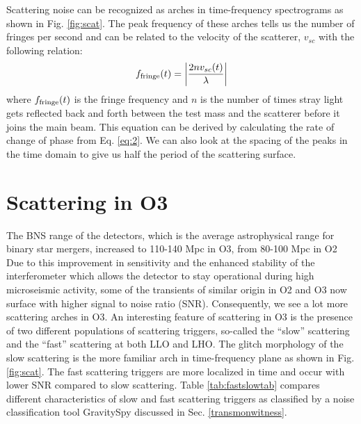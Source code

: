 \documentclass[12pt]{iopart}
\begin{document}
Scattering noise can be recognized as arches in time-frequency spectrograms as shown in Fig. \ref{fig:scat}. The peak frequency of these arches tells us the number of fringes per second and can be related to the velocity of the scatterer, $v_{sc}$ with the following relation:
\begin{equation}
    f_{\rm fringe}(t) = \left|\frac{2nv_{sc}(t)}{\lambda}\right|  \label{eq:3}
\end{equation}
where $f_{\rm fringe}(t)$ is the fringe frequency and $n$ is the number of times stray light gets reflected back and forth between the test mass and the scatterer before it joins the main beam. This equation can be derived by calculating the rate of change of phase from Eq. \ref{eq:2}.  We can also look at the spacing of the peaks in the time domain to give us half the period of the scattering surface. 






\section{Scattering in O3}\label{scatino3}
The BNS range of the detectors, which is the average astrophysical range for binary star mergers, increased to 110-140 Mpc in O3, from 80-100 Mpc in O2~\cite{prospect} Due to this improvement in sensitivity and the enhanced stability of the interferometer which allows the detector to stay operational during high microseismic activity, some of the transients of similar origin in O2 and O3 now surface with higher signal to noise ratio (SNR). 
Consequently, we see a lot more scattering arches in O3. An interesting feature of scattering in O3 is the presence of two different populations of scattering triggers, so-called the ``slow'' scattering and the ``fast'' scattering at both LLO and LHO. The glitch morphology of the slow scattering is the more familiar arch in time-frequency plane as shown in Fig. \ref{fig:scat}. The fast scattering triggers are more localized in time and occur with lower SNR compared to slow scattering. Table \ref{tab:fastslowtab} compares different characteristics of slow and fast scattering triggers as classified by a noise classification tool GravitySpy discussed in Sec. \ref{transmonwitness}.
\end{document}
